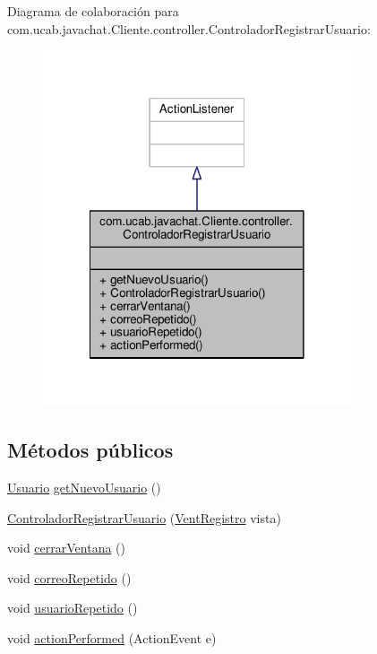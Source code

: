 Diagrama de colaboración para com.\-ucab.\-javachat.\-Cliente.\-controller.\-Controlador\-Registrar\-Usuario\-:\nopagebreak
\begin{figure}[H]
\begin{center}
\leavevmode
\includegraphics[width=258pt]{classcom_1_1ucab_1_1javachat_1_1_cliente_1_1controller_1_1_controlador_registrar_usuario__coll__graph}
\end{center}
\end{figure}
\subsection*{Métodos públicos}
\begin{DoxyCompactItemize}
\item 
\hyperlink{classcom_1_1ucab_1_1javachat_1_1_cliente_1_1model_1_1_usuario}{Usuario} \hyperlink{classcom_1_1ucab_1_1javachat_1_1_cliente_1_1controller_1_1_controlador_registrar_usuario_ae74c423df59d850fce66dc1ba049c563}{get\-Nuevo\-Usuario} ()
\item 
\hyperlink{classcom_1_1ucab_1_1javachat_1_1_cliente_1_1controller_1_1_controlador_registrar_usuario_ac501d29a542346226190021b56b11288}{Controlador\-Registrar\-Usuario} (\hyperlink{classcom_1_1ucab_1_1javachat_1_1_cliente_1_1view_1_1_vent_registro}{Vent\-Registro} vista)
\item 
void \hyperlink{classcom_1_1ucab_1_1javachat_1_1_cliente_1_1controller_1_1_controlador_registrar_usuario_a02bbff561df82eb06a129f6f12e33a35}{cerrar\-Ventana} ()
\item 
void \hyperlink{classcom_1_1ucab_1_1javachat_1_1_cliente_1_1controller_1_1_controlador_registrar_usuario_a803aeb4dc6e260ee0eb1be7e5603e088}{correo\-Repetido} ()
\item 
void \hyperlink{classcom_1_1ucab_1_1javachat_1_1_cliente_1_1controller_1_1_controlador_registrar_usuario_a340270aa28a899021ee92469aad2e270}{usuario\-Repetido} ()
\item 
void \hyperlink{classcom_1_1ucab_1_1javachat_1_1_cliente_1_1controller_1_1_controlador_registrar_usuario_a45806ea9b7bbbc99883ecb5a521ecf3b}{action\-Performed} (Action\-Event e)
\end{DoxyCompactItemize}


